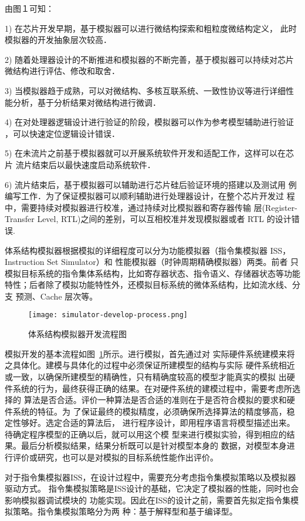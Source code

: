 由图１可知：


1) 在芯片开发早期，基于模拟器可以进行微结构探索和粗粒度微结构定义，
此时模拟器的开发抽象层次较高．


2) 随着处理器设计的不断推进和模拟器的不断完善，基于模拟器可以持续对芯片
微结构进行评估、修改和取舍．


3) 当模拟器趋于成熟，可以对微结构、多核互联系统、一致性协议等进行详细性
能分析，基于分析结果对微结构进行微调．


4) 在对处理器逻辑设计进行验证的阶段，模拟器可以作为参考模型辅助进行验证
，可以快速定位逻辑设计错误．


5) 在未流片之前基于模拟器就可以开展系统软件开发和适配工作，这样可以在芯片
流片结束后以最快速度启动系统软件．


6) 流片结束后，基于模拟器可以辅助进行芯片硅后验证环境的搭建以及测试用
例编写工作．为了保证模拟器可以顺利辅助进行处理器设计，在整个芯片开发过
程中，需要持续对模拟器进行校准，通过持续对比模拟器和寄存器传输
层(Register-Transfer Level, RTL)之间的差别，可以互相校准并发现模拟器或者 RTL
的设计错误.


体系结构模拟器根据模拟的详细程度可以分为功能模拟器（指令集模拟器 ISS，Instruction  Set  Simulator）和
性能模拟器（时钟周期精确模拟器）两类。前者
只模拟目标系统的指令集体系结构，比如寄存器状态、指令语义、存储器状态等功能
特性；后者除了模拟功能特性外，还模拟目标系统的微体系结构，比如流水线、分支
预测、Cache 层次等\cite{cachecengcideng}。
\begin{figure}[h]
  \centering
  \texttt{[image: simulator-develop-process.png]}
  \caption{体系结构模拟器开发流程图}
  \label{fig:sim-dev-process}
\end{figure}



模拟开发的基本流程如图~\ref{fig:sim-dev-process}所示。进行模拟，首先通过对
实际硬件系统建模来将之具体化。建模与具体化的过程中必须保证所建模型的结构与实际
硬件系统相近或一致，以确保所建模型的精确性，只有精确度较高的模型才能真实的模拟
出硬件系统的行为，最终获得正确的结果。在对硬件系统的建模过程中，需要考虑所选择的
算法是否合适。评价一种算法是否合适的准则在于是否符合模拟的要求和硬件系统的特征。为
了保证最终的模拟精度，必须确保所选择算法的精度够高，稳定性够好。选定合适的算法后，
进行程序设计，即用程序语言将模型描述出来。待确定程序模型的正确以后，就可以用这个模
型来进行模拟实验，得到相应的结果。最后分析模拟结果，结果分析既可以是针对模型本身的
数据，对模型本身进行评价或研究，也可以是对模拟的目标系统性能作出评价。


对于指令集模拟器ISS，在设计过程中，需要充分考虑指令集模拟策略以及模拟器驱动方式。
指令集模拟策略是ISS设计的基础，它决定了模拟器的性能，同时也会影响模拟器调试模块的
功能实现。因此在ISS的设计之前，需要首先拟定指令集模拟策略。指令集模拟策略分为两
种：基于解释型和基于编译型。

